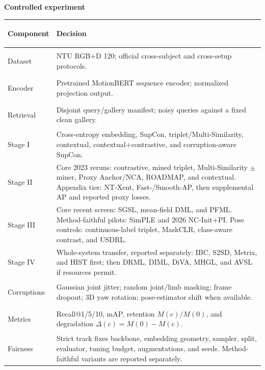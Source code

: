 \documentclass[10pt]{article}
\begin{document}
\textbf{Controlled experiment}\par\vspace{1mm}
{\small
\renewcommand{\arraystretch}{1.06}
\begin{tabularx}{\textwidth}{>{\bfseries\raggedright\arraybackslash}p{}Y}
\toprule
Component & Decision \\
\midrule
Dataset & NTU RGB+D 120; official cross-subject and cross-setup protocols. \\
Encoder & Pretrained MotionBERT sequence encoder; normalized projection output. \\
Retrieval & Disjoint query/gallery manifest; noisy queries against a fixed clean gallery. \\
Stage I & Cross-entropy embedding, SupCon, triplet/Multi-Similarity, contextual, contextual+contrastive, and corruption-aware SupCon. \\
Stage II & Core 2023 reruns: contrastive, mined triplet, Multi-Similarity $\pm$ miner, Proxy Anchor/NCA, ROADMAP, and contextual. Appendix tier: NT-Xent, Fast-/Smooth-AP, then supplemental AP and reported proxy losses. \\
Stage III & Core recent screen: SGSL, mean-field DML, and PFML. Method-faithful pilots: SimPLE and 2026 NC-Init+PI. Pose controls: continuous-label triplet, MaskCLR, class-aware contrast, and USDRL. \\
Stage IV & Whole-system transfer, reported separately: IBC, S2SD, Metrix, and HIST first; then DRML, DIML, DiVA, MHGL, and AVSL if resources permit. \\
Corruptions & Gaussian joint jitter; random joint/limb masking; frame dropout; 3D yaw rotation; pose-estimator shift when available. \\
Metrics & Recall@1/5/10, mAP, retention $M(c)/M(0)$, and degradation $\Delta(c)=M(0)-M(c)$. \\
Fairness & Strict track fixes backbone, embedding geometry, sampler, split, evaluator, tuning budget, augmentations, and seeds. Method-faithful variants are reported separately. \\
\bottomrule
\end{tabularx}}
\end{document}
